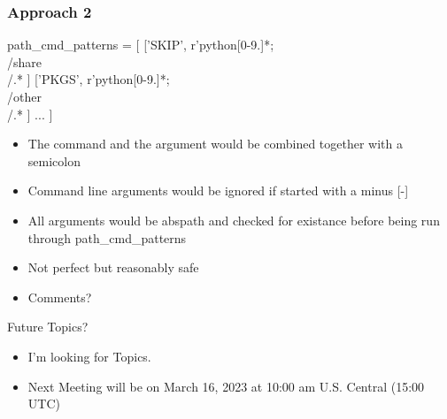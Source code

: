 \documentclass{beamer}
\begin{document}
\begin{frame}[fragile]
    \frametitle{Approach 2}
 {\tiny
    \begin{semiverbatim}
        path_cmd_patterns = [
        ['SKIP', r'python[0-9.]*;\\/share\\/.* ]
        ['PKGS', r'python[0-9.]*;\\/other\\/.* ]
           ...
           ]
    \end{semiverbatim}
}
  \begin{itemize}
    \item The command and the argument would be combined together with
      a semicolon
    \item Command line arguments would be ignored if started with a
      minus [-]
    \item All arguments would be abspath and checked for existance
      before being run through path\_cmd\_patterns
    \item Not perfect but reasonably safe
    \item Comments?
  \end{itemize}

\end{frame}

\begin{frame}{Future Topics?}
  \begin{itemize}
    \item I'm looking for Topics.
    \item Next Meeting will be on March 16, 2023 at 10:00 am
      U.S. Central (15:00 UTC)
  \end{itemize}
\end{frame}

%
\end{document}
